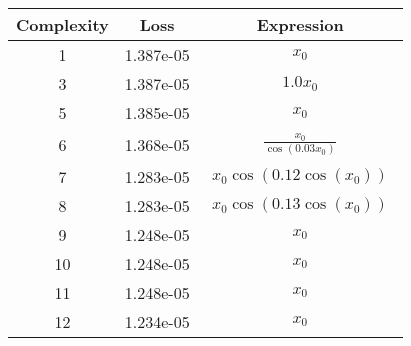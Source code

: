 \begin{center}
        \begin{tabular}{|c|c|c|}
        \hline
        Complexity & Loss & Expression \\
        \hline
        1 & 1.387e-05 & $\begin{aligned}x_{0}\end{aligned}$\\ \hline3 & 1.387e-05 & $\begin{aligned}1.0 x_{0}\end{aligned}$\\ \hline5 & 1.385e-05 & $\begin{aligned}x_{0}\end{aligned}$\\ \hline6 & 1.368e-05 & $\begin{aligned}\frac{x_{0}}{\cos{\left(0.03 x_{0} \right)}}\end{aligned}$\\ \hline7 & 1.283e-05 & $\begin{aligned}x_{0} \cos{\left(0.12 \cos{\left(x_{0} \right)} \right)}\end{aligned}$\\ \hline8 & 1.283e-05 & $\begin{aligned}x_{0} \cos{\left(0.13 \cos{\left(x_{0} \right)} \right)}\end{aligned}$\\ \hline9 & 1.248e-05 & $\begin{aligned}x_{0}\end{aligned}$\\ \hline10 & 1.248e-05 & $\begin{aligned}x_{0}\end{aligned}$\\ \hline11 & 1.248e-05 & $\begin{aligned}x_{0}\end{aligned}$\\ \hline12 & 1.234e-05 & $\begin{aligned}x_{0}\end{aligned}$\\ \hline\end{tabular}
        \end{center}
        